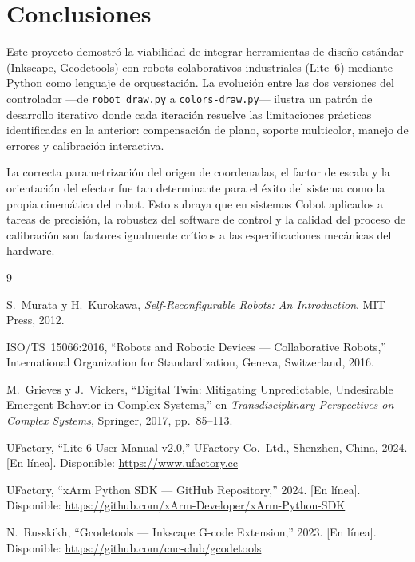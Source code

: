 \documentclass[journal,compsoc]{IEEEtran}
\begin{document}
\section{Conclusiones}

Este proyecto demostró la viabilidad de integrar herramientas de diseño estándar (Inkscape, Gcodetools) con robots colaborativos industriales (Lite~6) mediante Python como lenguaje de orquestación. La evolución entre las dos versiones del controlador ---de \texttt{robot\_draw.py} a \texttt{colors-draw.py}--- ilustra un patrón de desarrollo iterativo donde cada iteración resuelve las limitaciones prácticas identificadas en la anterior: compensación de plano, soporte multicolor, manejo de errores y calibración interactiva.

La correcta parametrización del origen de coordenadas, el factor de escala y la orientación del efector fue tan determinante para el éxito del sistema como la propia cinemática del robot. Esto subraya que en sistemas Cobot aplicados a tareas de precisión, la robustez del software de control y la calidad del proceso de calibración son factores igualmente críticos a las especificaciones mecánicas del hardware.

\begin{thebibliography}{9}

S.~Murata y H.~Kurokawa,
\textit{Self-Reconfigurable Robots: An Introduction}.
MIT Press, 2012.

ISO/TS~15066:2016,
``Robots and Robotic Devices --- Collaborative Robots,''
International Organization for Standardization, Geneva, Switzerland, 2016.

M.~Grieves y J.~Vickers,
``Digital Twin: Mitigating Unpredictable, Undesirable Emergent Behavior in Complex Systems,''
en \textit{Transdisciplinary Perspectives on Complex Systems},
Springer, 2017, pp.~85--113.

UFactory,
``Lite 6 User Manual v2.0,''
UFactory Co.~Ltd., Shenzhen, China, 2024.
[En línea]. Disponible: \url{https://www.ufactory.cc}

UFactory,
``xArm Python SDK --- GitHub Repository,''
2024.
[En línea]. Disponible: \url{https://github.com/xArm-Developer/xArm-Python-SDK}

N.~Russkikh,
``Gcodetools --- Inkscape G-code Extension,''
2023.
[En línea]. Disponible: \url{https://github.com/cnc-club/gcodetools}

\end{thebibliography}
\end{document}

